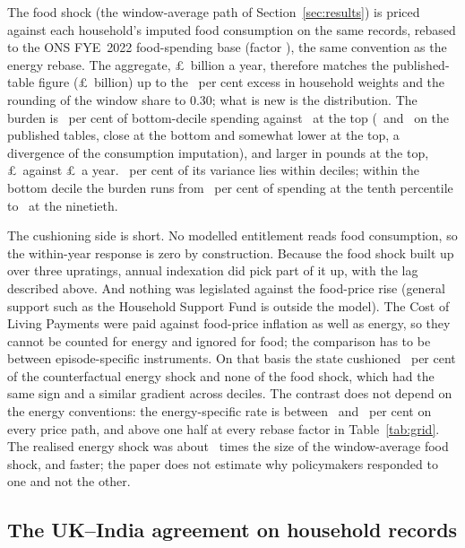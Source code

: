 The food shock (the window-average path of
Section~\ref{sec:results}) is priced against each household's imputed
food consumption on the same records, rebased to the ONS FYE~2022
food-spending base (factor \SsTcaSsFoodRebase), the same convention as
the energy rebase. The aggregate, \pounds\SsTcaSsAggBn\ billion a
year, therefore matches the published-table figure
(\pounds\MsTcaWindowAvgAggBn\ billion) up to the \SsWeightExcessPct\ per cent excess in household weights and the rounding of the window share to 0.30; what is new is the
distribution. The burden is \SsTcaSsPctSpendDecOne\ per cent of
bottom-decile spending against \SsTcaSsPctSpendDecTen\ at the top
(\MsTcaWindowAvgPctSpendDecOne\ and \MsTcaWindowAvgPctSpendDecTen\ on
the published tables, close at the bottom and somewhat lower at the
top, a divergence of the consumption imputation), and larger in pounds
at the top, \pounds\SsTcaSsGbpDecOne\ against
\pounds\SsTcaSsGbpDecTen\ a year. \SsTcaSsWithinPct\ per cent of its
variance lies within deciles; within the bottom decile the burden runs
from \SsTcaSsPTenDecOne\ per cent of spending at the tenth percentile
to \SsTcaSsPNinetyDecOne\ at the ninetieth.

The cushioning side is short. No modelled entitlement reads food
consumption, so the within-year response is zero by construction.
Because the food shock built up over three upratings, annual
indexation did pick part of it up, with the lag described above. And
nothing was legislated against the food-price rise (general support
such as the Household Support Fund is outside the model). The Cost of Living Payments were paid against food-price inflation
as well as energy, so they cannot be counted for energy and ignored for
food; the comparison has to be between episode-specific instruments.
On that basis the state cushioned \SsEnergySpecificRatePct\ per cent
of the counterfactual energy shock and none of the food shock, which
had the same sign and a similar gradient across deciles. The contrast
does not depend on the energy conventions: the energy-specific rate is
between \SsEnergySpecificRateMinPct\ and \SsEnergySpecificRateMaxPct\
per cent on every price path, and above one half at every rebase
factor in Table~\ref{tab:grid}. The realised
energy shock was about \SsEnergyToTcaRatio\ times the size of the
window-average food shock, and faster; the paper does not estimate why
policymakers responded to one and not the other.

\subsection{The UK--India agreement on household records}\label{sec:results-ceta-ss}

